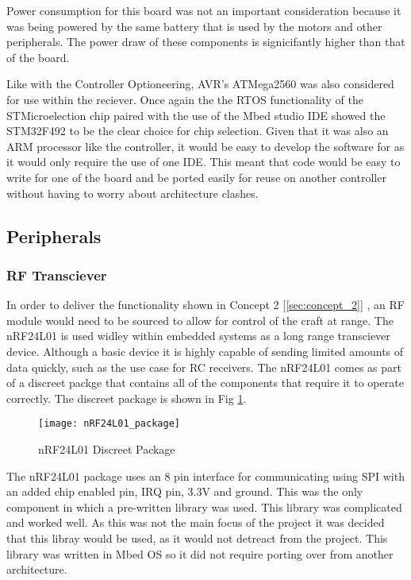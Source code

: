 \documentclass [11pt]{article}
\begin{document}
Power consumption for this board was not an important consideration because it was being powered by the same battery that is used by the motors and other peripherals. The power draw of these components is signicifantly higher than that of the board.

Like with the Controller Optioneering, AVR's ATMega2560 was also considered for use within the reciever. Once again the the RTOS functionality of the STMicroelection  chip paired with the use of the Mbed studio IDE showed the STM32F492 to be the clear choice for chip selection. Given that it was also an ARM processor like the controller, it would be easy to develop the software for as it would only require the use of one IDE. This meant that code would be easy to write for one of the board and be ported easily for reuse on another controller without having to worry about architecture clashes.       

\subsection{Peripherals}
\subsubsection{RF Transciever}

In order to deliver the functionality shown in Concept 2 [\ref{sec:concept_2}] , an RF module would need to be sourced to allow for control of the craft at range. The nRF24L01 is used widley within embedded systems as a long range transciever device. Although a basic device it is highly capable of sending limited amounts of data quickly, such as the use case for RC receivers. The nRF24L01 comes as part of a discreet packge that contains all of the components that require it to operate correctly. The discreet package is shown in Fig \ref{fig:nRF24L01_package}.

\begin{figure}[H]
\centerline{\texttt{[image: nRF24L01\_package]}}
\caption{nRF24L01 Discreet Package}
\label{fig:nRF24L01_package}
\end{figure}

The nRF24L01 package uses an 8 pin interface for communicating using SPI with an added chip enabled pin, IRQ pin, 3.3V and ground. This was the only component in which a pre-written library was used. This library was complicated and worked well. As this was not the main focus of the project it was decided that this libray would be used, as it would not detreact from the project. This library was written in Mbed OS so it did not require porting over from another architecture.  
\end{document}
